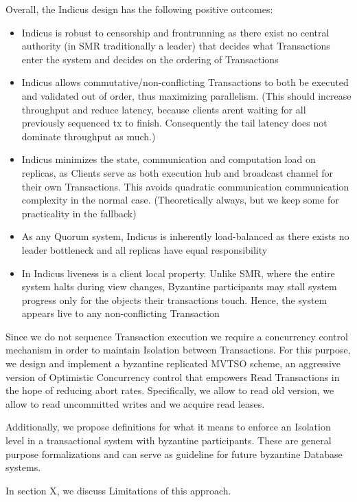 Overall, the Indicus design has the following positive outcomes:
\begin{itemize}

\item Indicus is robust to censorship and frontrunning as there exist no central authority (in SMR traditionally a leader) that decides what Transactions enter the system and decides on the ordering of Transactions
\item Indicus allows commutative/non-conflicting Transactions to both be executed and validated out of order, thus maximizing parallelism. (This should increase throughput and reduce latency, because clients arent waiting for all previously sequenced tx to finish. Consequently the tail latency does not dominate throughput as much.)
\item Indicus minimizes the state, communication and computation load on replicas, as Clients serve as both execution hub and broadcast channel for their own Transactions. This avoids quadratic communication communication complexity in the normal case. (Theoretically always, but we keep some for practicality in the fallback)
\item As any Quorum system, Indicus is inherently load-balanced as there exists no leader bottleneck and all replicas have equal responsibility
\item In Indicus liveness is a client local property. Unlike SMR, where the entire system halts during view changes, Byzantine participants may stall system progress only for the objects their transactions touch. Hence, the system appears live to any non-conflicting Transaction
\end{itemize}

Since we do not sequence Transaction execution we require a concurrency control mechanism in order to maintain Isolation between Transactions.
For this purpose, we design and implement a byzantine replicated MVTSO scheme, an aggressive version of Optimistic Concurrency control that empowers Read Transactions in the hope of reducing abort rates. Specifically, we allow to read old version, we allow to read uncommitted writes and we acquire read leases.

Additionally, we propose definitions for what it means to enforce an Isolation level in a transactional system with byzantine participants. These are general purpose formalizations and can serve as guideline for future byzantine Database systems.

In section X, we discuss Limitations of this approach. 

